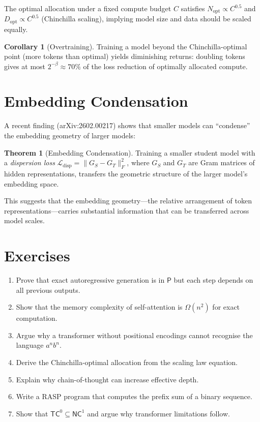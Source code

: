 \documentclass[11pt,a4paper]{book}
\theoremstyle{definition}
\newtheorem{theorem}{Theorem}[chapter]
\newtheorem{corollary}{Corollary}[chapter]
\begin{document}
The optimal allocation under a fixed compute budget $C$ satisfies $N_\text{opt} \propto C^{0.5}$ and $D_\text{opt} \propto C^{0.5}$ (Chinchilla scaling), implying model size and data should be scaled equally.

\begin{corollary}[Overtraining]
	Training a model beyond the Chinchilla-optimal point (more tokens than optimal) yields diminishing returns: doubling tokens gives at most $2^{-\beta} \approx 70\%$ of the loss reduction of optimally allocated compute.
\end{corollary}

\section{Embedding Condensation}

A recent finding (arXiv:2602.00217) shows that smaller models can ``condense'' the embedding geometry of larger models:

\begin{theorem}[Embedding Condensation]
	Training a smaller student model with a \emph{dispersion loss} $\mathcal{L}_{\text{disp}} = \|G_S - G_T\|_F^2$, where $G_S$ and $G_T$ are Gram matrices of hidden representations, transfers the geometric structure of the larger model's embedding space.
\end{theorem}

This suggests that the embedding geometry---the relative arrangement of token representations---carries substantial information that can be transferred across model scales.

\section{Exercises}

\begin{enumerate}
	\item Prove that exact autoregressive generation is in $\mathsf{P}$ but each step depends on all previous outputs.
	\item Show that the memory complexity of self-attention is $\Omega(n^2)$ for exact computation.
	\item Argue why a transformer without positional encodings cannot recognise the language $a^n b^n$.
	\item Derive the Chinchilla-optimal allocation from the scaling law equation.
	\item Explain why chain-of-thought can increase effective depth.
	\item Write a RASP program that computes the prefix sum of a binary sequence.
	\item Show that $\mathsf{TC}^0 \subseteq \mathsf{NC}^1$ and argue why transformer limitations follow.
\end{enumerate}
\end{document}
